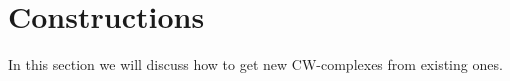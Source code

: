 \section{Constructions}

In this section we will discuss how to get new CW-complexes from existing ones.



